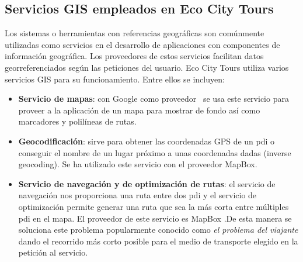 	\subsection{Servicios GIS empleados en Eco City Tours}
	Los sistemas o herramientas con referencias geográficas son comúnmente utilizadas como servicios en el desarrollo de aplicaciones con componentes de información geográfica. Los proveedores de estos servicios facilitan datos georreferenciados según las peticiones del usuario. Eco City Tours utiliza varios servicios GIS para su funcionamiento. Entre ellos se incluyen:
	\begin{itemize}
		\item \textbf{Servicio de mapas}: con Google como proveedor~\cite{google_maps} se usa este servicio para proveer a la aplicación de un mapa para mostrar de fondo así como marcadores y polilíneas de rutas.
		
		\item \textbf{Geocodificación}: sirve para obtener las coordenadas GPS de un \acrlong{pdi} o conseguir el nombre de un lugar próximo a unas coordenadas dadas (inverse geocoding). Se ha utilizado este servicio con el proveedor MapBox.\cite{mapbox_geocoding}
		
		\item \textbf{Servicio de navegación y de optimización de rutas}: el servicio de navegación \cite{mapbox_directions} nos proporciona una ruta entre dos \acrlong{pdi} y el servicio de optimización permite generar una ruta que sea la más corta entre múltiples \acrshort{pdi} en el mapa. El proveedor de este servicio es MapBox \cite{mapbox_optimization}.De esta manera se soluciona este problema popularmente conocido como \textit{el problema del viajante}\cite{ubu_algoritmia} dando el recorrido más corto posible para el medio de transporte elegido en la petición al servicio.
		
	\end{itemize}
	
